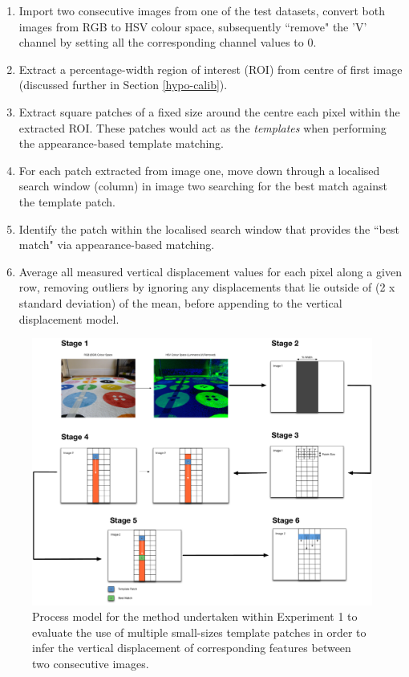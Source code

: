 \begin{enumerate}
\item Import two consecutive images from one of the test datasets, convert both images from RGB to HSV colour space, subsequently ``remove" the 'V' channel by setting all the corresponding channel values to 0.
\item Extract a percentage-width region of interest (ROI) from centre of first image (discussed further in Section \ref{hypo-calib}).
\item Extract square patches of a fixed size around the centre each pixel within the extracted ROI. These patches would act as the \textit{templates} when performing the appearance-based template matching. 
\item For each patch extracted from image one, move down through a localised search window (column) in image two searching for the best match against the template patch.
\item Identify the patch within the localised search window that provides the ``best match" via appearance-based matching.
\item Average all measured vertical displacement values for each pixel along a given row, removing outliers by ignoring any displacements that lie outside of (2 x standard deviation) of the mean, before appending to the vertical displacement model.
\end{enumerate}

\begin{figure}[ht!]
\centering
\includegraphics[scale=0.2]{images/ex1stages.pdf}
  \caption{Process model for the method undertaken within Experiment 1 to evaluate the use of multiple small-sizes template patches in order to infer the vertical displacement of corresponding features between two consecutive images.}
\label{fig:ex1process}
\end{figure} 



